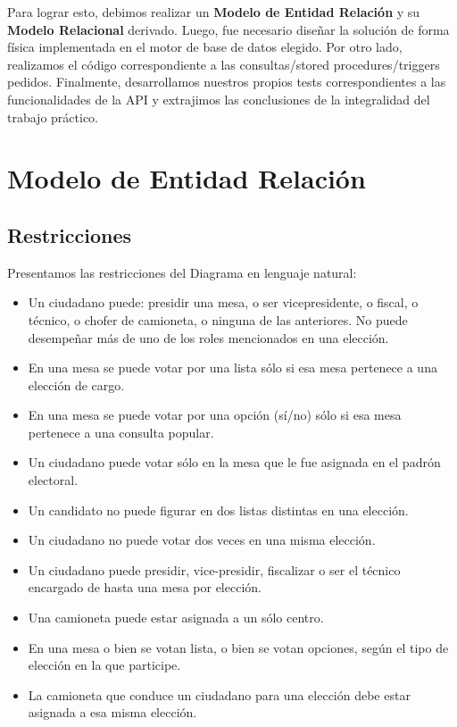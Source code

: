 \documentclass[10pt,a4paper]{article}
\begin{document}
Para lograr esto, debimos realizar un \textbf{Modelo de Entidad Relación} y su \textbf{Modelo Relacional} derivado. Luego, fue necesario diseñar la solución de forma física implementada en el motor de base de datos elegido. Por otro lado, realizamos el código correspondiente a las consultas/stored procedures/triggers pedidos. Finalmente, desarrollamos nuestros propios tests correspondientes a las funcionalidades de la API y extrajimos las conclusiones de la integralidad del trabajo práctico.

\newpage
\section{Modelo de Entidad Relación}

%

\subsection{Restricciones}
Presentamos las restricciones del Diagrama en lenguaje natural:
\begin{itemize}
\item Un ciudadano puede: presidir una mesa, o ser vicepresidente, o fiscal, o técnico, o chofer de camioneta, o ninguna de las anteriores. No puede desempeñar más de uno de los roles mencionados en una elección.
\item En una mesa se puede votar por una lista sólo si esa mesa pertenece a una elección de cargo.
\item En una mesa se puede votar por una opción (sí/no) sólo si esa mesa pertenece a una consulta popular.
\item Un ciudadano puede votar sólo en la mesa que le fue asignada en el padrón electoral.
\item Un candidato no puede figurar en dos listas distintas en una elección.
\item Un ciudadano no puede votar dos veces en una misma elección.
\item Un ciudadano puede presidir, vice-presidir, fiscalizar o ser el técnico encargado de hasta una mesa por elección.
\item Una camioneta puede estar asignada a un sólo centro.
\item En una mesa o bien se votan lista, o bien se votan opciones, según el tipo de elección en la que participe.
\item La camioneta que conduce un ciudadano para una elección debe estar asignada a esa misma elección.

\end{itemize}
\newpage
\end{document}
